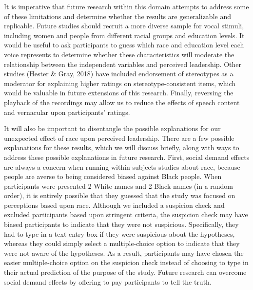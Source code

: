 \documentclass[
  english,
  man, noextraspace,floatsintext]{apa6}
\begin{document}
It is imperative that future research within this domain attempts to address some of these limitations and determine whether the results are generalizable and replicable. Future studies should recruit a more diverse sample for vocal stimuli, including women and people from different racial groups and education levels. It would be useful to ask participants to guess which race and education level each voice represents to determine whether these characteristics will moderate the relationship between the independent variables and perceived leadership. Other studies (Hester \& Gray, 2018) have included endorsement of stereotypes as a moderator for explaining higher ratings on stereotype-consistent items, which would be valuable in future extensions of this research. Finally, reversing the playback of the recordings may allow us to reduce the effects of speech content and vernacular upon participants' ratings.

It will also be important to disentangle the possible explanations for our unexpected effect of race upon perceived leadership. There are a few possible explanations for these results, which we will discuss briefly, along with ways to address these possible explanations in future research. First, social demand effects are always a concern when running within-subjects studies about race, because people are averse to being considered biased against Black people. When participants were presented 2 White names and 2 Black names (in a random order), it is entirely possible that they guessed that the study was focused on perceptions based upon race. Although we included a suspicion check and excluded participants based upon stringent criteria, the suspicion check may have biased participants to indicate that they were not suspicious. Specifically, they had to type in a text entry box if they were suspicious about the hypotheses, whereas they could simply select a multiple-choice option to indicate that they were not aware of the hypotheses. As a result, participants may have chosen the easier multiple-choice option on the suspicion check instead of choosing to type in their actual prediction of the purpose of the study. Future research can overcome social demand effects by offering to pay participants to tell the truth.
\end{document}
